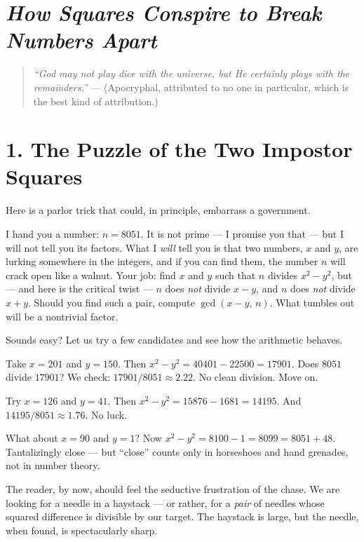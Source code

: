 \section{\texorpdfstring{\emph{How Squares Conspire to Break Numbers Apart}}{How Squares Conspire to Break Numbers Apart}}\label{ch11-how-squares-conspire-to-break-numbers-apart}



\begin{quote}
\emph{``God may not play dice with the universe, but He certainly plays with the remainders.''} --- (Apocryphal, attributed to no one in particular, which is the best kind of attribution.)
\end{quote}



\section{1. The Puzzle of the Two Impostor Squares}\label{ch11-the-puzzle-of-the-two-impostor-squares}

Here is a parlor trick that could, in principle, embarrass a government.

I hand you a number: \(n = 8051\). It is not prime --- I promise you that --- but I will not tell you its factors. What I \emph{will} tell you is that two numbers, \(x\) and \(y\), are lurking somewhere in the integers, and if you can find them, the number \(n\) will crack open like a walnut. Your job: find \(x\) and \(y\) such that \(n\) divides \(x^2 - y^2\), but --- and here is the critical twist --- \(n\) does \emph{not} divide \(x - y\), and \(n\) does \emph{not} divide \(x + y\). Should you find such a pair, compute \(\gcd(x - y, \, n)\). What tumbles out will be a nontrivial factor.

Sounds easy? Let us try a few candidates and see how the arithmetic behaves.

Take \(x = 201\) and \(y = 150\). Then \(x^2 - y^2 = 40401 - 22500 = 17901\). Does \(8051\) divide \(17901\)? We check: \(17901 / 8051 \approx 2.22\). No clean division. Move on.

Try \(x = 126\) and \(y = 41\). Then \(x^2 - y^2 = 15876 - 1681 = 14195\). And \(14195 / 8051 \approx 1.76\). No luck.

What about \(x = 90\) and \(y = 1\)? Now \(x^2 - y^2 = 8100 - 1 = 8099 = 8051 + 48\). Tantalizingly close --- but ``close'' counts only in horseshoes and hand grenades, not in number theory.

The reader, by now, should feel the seductive frustration of the chase. We are looking for a needle in a haystack --- or rather, for a \emph{pair} of needles whose squared difference is divisible by our target. The haystack is large, but the needle, when found, is spectacularly sharp.

